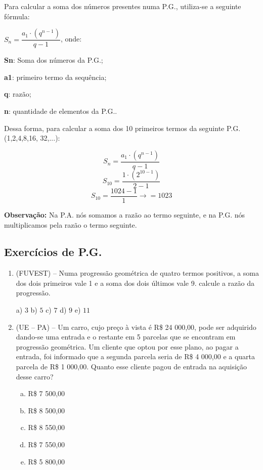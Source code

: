 \begin{multicols*}{2}
	Para calcular a soma dos números presentes numa P.G., utiliza-se a seguinte fórmula:

	{$ S_n = \dfrac{a_1 \cdot (q^{n -1})}{q -1} $}, onde:

	\textbf{Sn}: Soma dos números da P.G.;

	\textbf{a1}: primeiro termo da sequência;

	\textbf{q}: razão;

	\textbf{n}: quantidade de elementos da P.G..

	Dessa forma, para calcular a soma dos 10 primeiros termos da seguinte P.G. {(1,2,4,8,16, 32,...)}:

	\[S_n = \dfrac{a_1 \cdot (q^{n -1})}{q -1}\]
	\[S_{10} = \dfrac{1 \cdot (2^{10 -1})}{2 -1}\]
	\[S_{10} = \dfrac{1024 -1}{1} \to = 1023\]

	\textbf{Observação:} Na P.A. nós somamos a razão ao termo seguinte, e na P.G. nós multiplicamos pela razão o termo seguinte.

	\subsection*{Exercícios de P.G.}

	\begin{enumerate}[wide, labelwidth=!, labelindent=0pt]

		\item  (FUVEST)  --  Numa progressão geométrica de quatro termos positivos, a soma dos dois primeiros vale 1 e a soma dos dois últimos vale 9. calcule a razão da progressão.

		      a) $3 $ b) $5 $ c) $7 $ d) $9 $ e) $11$

		\item (UE  --  PA)  --  Um carro, cujo preço à vista é R\$ 24 000,00, pode ser adquirido dando-se uma entrada e o restante em 5 parcelas que se encontram em progressão geométrica. Um cliente que optou por esse plano, ao pagar a entrada, foi informado que a segunda parcela seria de R\$ 4 000,00 e a quarta parcela de R\$ 1 000,00. Quanto esse cliente pagou de entrada na aquisição desse carro?
		\begin{enumerate}[(a)]
			\item R\$ 7 500,00
			\item R\$ 8 500,00
			\item R\$ 8 550,00
			\item R\$ 7 550,00
			\item R\$ 5 800,00
		\end{enumerate}


\end{enumerate}
\end{multicols*}
